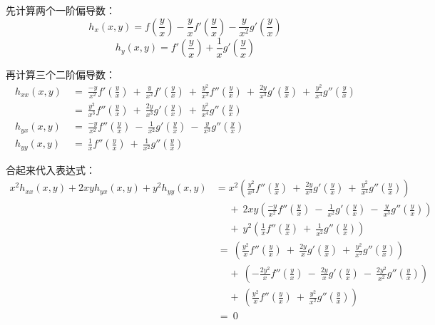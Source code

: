 \begin{solution}
先计算两个一阶偏导数：
$$
h_{x}(x,y) = f\left(\frac{y}{x}\right) -  \frac{y}{x} f'\left(\frac{y}{x}\right) - \frac{y}{x^2}g'\left(\frac{y}{x}\right)
$$
$$
h_{y}(x,y) = f'\left(\frac{y}{x}\right) + \frac{1}{x}g'\left(\frac{y}{x}\right)
$$\par
再计算三个二阶偏导数：
\begin{equation}
    \begin{aligned}
    h_{xx}(x,y) &~=~ \frac{-y}{x^2}f'\left(\frac{y}{x}\right)
    ~+~ \frac{y}{x^2}f'\left(\frac{y}{x}\right)
    ~+~ \frac{y^2}{x^3}f''\left(\frac{y}{x}\right)
    ~+~ \frac{2y}{x^3}g'\left(\frac{y}{x}\right)
    ~+~ \frac{y^2}{x^4}g''\left(\frac{y}{x}\right) \\
    &~=~ \frac{y^2}{x^3}f''\left(\frac{y}{x}\right)
    ~+~ \frac{2y}{x^3}g'\left(\frac{y}{x}\right)
    ~+~ \frac{y^2}{x^4}g''\left(\frac{y}{x}\right) \\
    h_{yx}(x,y) &~=~ \frac{-y}{x^2} f''\left(\frac{y}{x}\right)
    ~-~\frac{1}{x^2}g'\left(\frac{y}{x}\right)
    ~-~\frac{y}{x^3}g''\left(\frac{y}{x}\right) \\
    h_{yy}(x,y) &~=~ \frac{1}{x}f''\left(\frac{y}{x}\right)
    ~+~ \frac{1}{x^2}g''\left(\frac{y}{x}\right)
    \nonumber
    \end{aligned}
\end{equation} \par
合起来代入表达式：
\begin{equation}
    \begin{aligned}
        x^2 h_{xx}(x,y) + 2xy h_{yx}(x,y) + y^2 h_{yy}(x,y)
        &= x^2 \left( \frac{y^2}{x^3}f''\left(\frac{y}{x}\right)
        ~+~ \frac{2y}{x^3}g'\left(\frac{y}{x}\right)
        ~+~ \frac{y^2}{x^4}g''\left(\frac{y}{x}\right) \right) \\
        &~~~~~~+~ 2xy \left( \frac{-y}{x^2} f''\left(\frac{y}{x}\right)
        ~-~\frac{1}{x^2}g'\left(\frac{y}{x}\right)
        ~-~\frac{y}{x^3}g''\left(\frac{y}{x}\right) \right) \\
        &~~~~~~+~y^2 \left( \frac{1}{x}f''\left(\frac{y}{x}\right)
        ~+~ \frac{1}{x^2}g''\left(\frac{y}{x}\right)\right) \\
        &~=~  \left( \frac{y^2}{x}f''\left(\frac{y}{x}\right)
        ~+~ \frac{2y}{x}g'\left(\frac{y}{x}\right)
        ~+~ \frac{y^2}{x^2}g''\left(\frac{y}{x}\right) \right) \\
        &~~~~~~+~  \left( -\frac{2y^2}{x} f''\left(\frac{y}{x}\right)
        ~-~\frac{2y}{x}g'\left(\frac{y}{x}\right)
        ~-~\frac{2y^2}{x^2}g''\left(\frac{y}{x}\right) \right) \\
        &~~~~~~+~  \left( \frac{y^2}{x}f''\left(\frac{y}{x}\right)
        ~+~ \frac{y^2}{x^2}g''\left(\frac{y}{x}\right) \right) \\
        &~=~0
        \nonumber
    \end{aligned}
\end{equation}
\end{solution}

